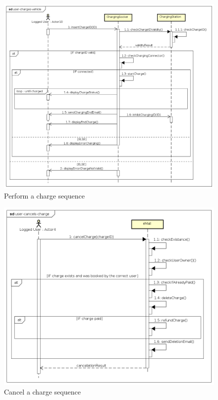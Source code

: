 \begin{figure}[!h]
    \begin{center}
        \includegraphics[keepaspectratio, width=16cm]{Sequence/user-charges-vehicle.png}
        \caption{Perform a charge sequence}
    \end{center}
\end{figure}
\begin{figure}[!h]
    \begin{center}
        \includegraphics[keepaspectratio, width=16cm]{Sequence/user-cancels-charge.png}
        \caption{Cancel a charge sequence}
    \end{center}
\end{figure}

